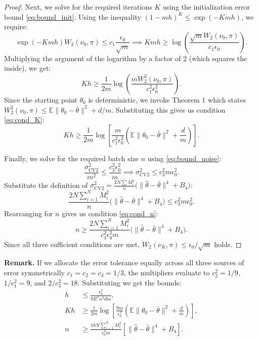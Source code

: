 \begin{proof}
Next, we solve for the required iterations $K$ using the initialization error bound \eqref{eq:bound_init}. Using the inequality $(1-mh)^K \leq \exp(-Kmh)$, we require:
\begin{equation}
    \exp(-Kmh) W_2(\nu_0, \pi) \leq c_1 \frac{\epsilon_0}{\sqrt{m}} \implies Kmh \geq \log\left( \frac{\sqrt{m} W_2(\nu_0, \pi)}{c_1 \epsilon_0} \right).
\end{equation}
Multiplying the argument of the logarithm by a factor of 2 (which squares the inside), we get:
\begin{equation}
    Kh \geq \frac{1}{2m} \log\left( \frac{m W_2^2(\nu_0, \pi)}{c_1^2 \epsilon_0^2} \right).
\end{equation}
Since the starting point $\theta_0$ is deterministic, we invoke Theorem 1 \cite{durmus2016highdimensional} which states $W_2^2(\nu_0, \pi) \leq \mathbb{E}\|\theta_0 - \bar\theta\|^2 + d/m$. Substituting this gives us condition \eqref{eq:cond_K}:
\begin{equation}
    Kh \geq \frac{1}{2m} \log\left[ \frac{m}{c_1^2 \epsilon_0^2} \left( \mathbb{E}\|\theta_0 - \bar\theta\|^2 + \frac{d}{m} \right) \right].
\end{equation}

Finally, we solve for the required batch size $n$ using \eqref{eq:bound_noise}:
\begin{equation}
    \frac{\sigma_{\text{CV2}}^2}{m^2} \leq \frac{c_3^2 \epsilon_0^2}{m} \implies \sigma_{\text{CV2}}^2 \leq c_3^2 m \epsilon_0^2.
\end{equation}
Substitute the definition of $\sigma^2_{\text{CV2}} = \frac{2N\sum M_i^2}{n}\big(\|\hat\theta - \bar\theta\|^4 + B_4\big)$:
\begin{equation}
    \frac{2N\sum_{i=1}^N M_i^2}{n}\Big(\|\hat\theta - \bar\theta\|^4 + B_4\Big) \leq c_3^2 m \epsilon_0^2.
\end{equation}
Rearranging for $n$ gives us condition \eqref{eq:cond_n}:
\begin{equation}
    n \geq \frac{2 N \sum_{i=1}^N M_i^2}{c_3^2 \epsilon_0^2 m} \Big( \|\hat\theta - \bar\theta\|^4 + B_4 \Big).
\end{equation}
Since all three sufficient conditions are met, $W_2(\nu_K, \pi) \leq \epsilon_0 / \sqrt{m}$ holds.
\end{proof}

\textbf{Remark.} If we allocate the error tolerance equally across all three sources of error symmetrically $c_1 = c_2 = c_3 = 1/3$, the multipliers evaluate to $c_2^2 = 1/9$, $1/c_1^2 = 9$, and $2/c_3^2 = 18$. Substituting we get the bounds:
\begin{align}
    h &\leq \frac{\epsilon_0^2}{9 R^2 \alpha^2 d m}, \\
    Kh &\geq \frac{1}{2m} \log\left[ \frac{9m}{\epsilon_0^2} \left( \mathbb{E}\|\theta_0 - \bar\theta\|^2 + \frac{d}{m} \right) \right], \\
    n &\geq \frac{18 N \sum_{i=1}^N M_i^2}{\epsilon_0^2 m} \left[ \|\hat\theta - \bar\theta\|^4 + B_4 \right].
\end{align}

